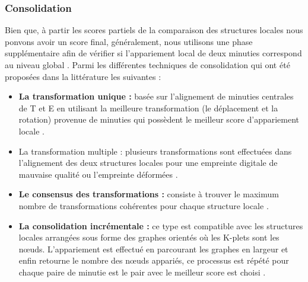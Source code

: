 \subsubsection{Consolidation}
Bien que, à partir les scores partiels de la comparaison des structures locales nous ponvons avoir un score final, généralement, nous utilisons une phase supplémentaire afin de vérifier si l'appariement local de deux minuties correspond au niveau global \citep{maltoni2009handbook}. Parmi les différentes techniques de consolidation qui ont été proposées dans la littérature les suivantes :
\begin{itemize}
	\item \textbf{La transformation unique :} basée sur l'alignement de minuties centrales de T et E en utilisant la meilleure transformation (le déplacement et la rotation) provenue de minuties qui possèdent le meilleur score d'appariement locale \citep{jiang2000fingerprint}.
	\item 	La transformation multiple : plusieurs transformations sont effectuées dans l'alignement des deux structures locales pour une empreinte digitale de mauvaise qualité ou l'empreinte déformées \citep{maltoni2009handbook}.
	\item \textbf{Le consensus des transformations : }consiste à trouver le  maximum  nombre de transformations cohérentes pour chaque structure locale \citep{maltoni2009handbook}.
	\item \textbf{La consolidation incrémentale :} ce type est compatible avec les structures locales arrangées sous forme des graphes orientés où les K-plets sont les nœuds. L'appariement est effectué en parcourant les graphes en largeur et enfin  retourne le nombre des nœuds appariés, ce processus est répété pour chaque paire de minutie est le pair avec le meilleur score est choisi \citep{chikkerur2006k}.
\end{itemize}
